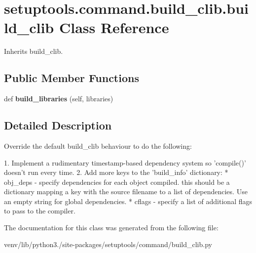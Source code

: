 \hypertarget{classsetuptools_1_1command_1_1build__clib_1_1build__clib}{}\section{setuptools.\+command.\+build\+\_\+clib.\+build\+\_\+clib Class Reference}
\label{classsetuptools_1_1command_1_1build__clib_1_1build__clib}


Inherits build\+\_\+clib.

\subsection*{Public Member Functions}
\begin{DoxyCompactItemize}
\item 
\mbox{\label{classsetuptools_1_1command_1_1build__clib_1_1build__clib_a0f23e07ecec40a09f77d20205db47ae8}} 
def {\bfseries build\+\_\+libraries} (self, libraries)
\end{DoxyCompactItemize}


\subsection{Detailed Description}
\begin{DoxyVerb}Override the default build_clib behaviour to do the following:

1. Implement a rudimentary timestamp-based dependency system
   so 'compile()' doesn't run every time.
2. Add more keys to the 'build_info' dictionary:
    * obj_deps - specify dependencies for each object compiled.
                 this should be a dictionary mapping a key
                 with the source filename to a list of
                 dependencies. Use an empty string for global
                 dependencies.
    * cflags   - specify a list of additional flags to pass to
                 the compiler.
\end{DoxyVerb}
 

The documentation for this class was generated from the following file\+:\begin{DoxyCompactItemize}
\item 
venv/lib/python3./site-\/packages/setuptools/command/build\+\_\+clib.\+py\end{DoxyCompactItemize}
